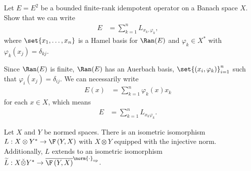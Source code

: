 \documentclass[10pt]{mypackage}
\begin{document}
\begin{exercise}
  Let $E = E^2$ be a bounded finite-rank idempotent operator on a Banach space $X$. Show that we can write
  \begin{align*}
    E &= \sum_{k=1}^{n}L_{x_k,\varphi_k},
  \end{align*}
  where $\set{x_1,\dots,x_n}$ is a Hamel basis for $\Ran(E)$ and $\varphi_{k}\in X^{\ast}$ with $\varphi_{k}\left(x_j\right) = \delta_{kj}$.
\end{exercise}
\begin{solution}
  Since $\Ran(E)$ is finite, $\Ran(E)$ has an Auerbach basis, $\set{\left(x_i,\varphi_k\right)}_{i=1}^{n}$ such that $\varphi_{i}\left(x_j\right) = \delta_{ij}$. We can necessarily write
  \begin{align*}
    E(x) &= \sum_{k=1}^{n}\varphi_{k}\left(x\right)x_k
  \end{align*}
  for each $x\in X$, which means
  \begin{align*}
    E &= \sum_{k=1}^{n}L_{x_k\varphi_{k}}.
  \end{align*}
\end{solution}
\begin{proposition}
  Let $X$ and $Y$ be normed spaces. There is an isometric isomorphism $L: X\otimes Y^{\ast}\rightarrow \F\left(Y,X\right)$ with $X\otimes Y$ equipped with the injective norm. Additionally, $L$ extends to an isometric isomorphism $\widetilde{L}: X\check\otimes Y^{\ast}\rightarrow \overline{\F\left(Y,X\right)}^{\norm{\cdot}_{\text{op}}}$.
\end{proposition}
\end{document}
